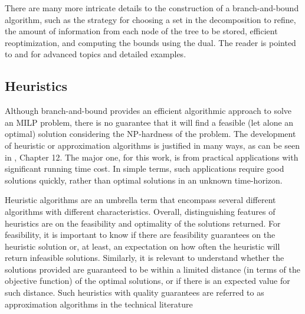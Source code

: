 
There are many more intricate details to the construction of a branch-and-bound algorithm, such as the strategy for choosing a set in the decomposition to refine, the amount of information from each node of the tree to be stored, efficient reoptimization, and computing the bounds using the dual.
The reader is pointed to  and  for advanced topics and detailed examples.


\subsection{Heuristics}\label{sec:heuristics}

Although branch-and-bound provides an efficient algorithmic approach to solve an MILP problem, there is no guarantee that it will find a feasible (let alone an optimal) solution considering the NP-hardness of the problem.
The development of heuristic or approximation algorithms is justified in many ways, as can be seen in , Chapter 12.
The major one, for this work, is from practical applications with significant running time cost.
In simple terms, such applications require good solutions quickly, rather than optimal solutions in an unknown time-horizon.

Heuristic algorithms are an umbrella term that encompass several different algorithms with different characteristics.
Overall, distinguishing features of heuristics are on the feasibility and optimality of the solutions returned.
For feasibility, it is important to know if there are feasibility guarantees on the heuristic solution or, at least, an expectation on how often the heuristic will return infeasible solutions.
Similarly, it is relevant to understand whether the solutions provided are guaranteed to be within a limited distance (in terms of the objective function) of the optimal solutions, or if there is an expected value for such distance. 
Such heuristics with quality guarantees are referred to as approximation algorithms in the technical literature

